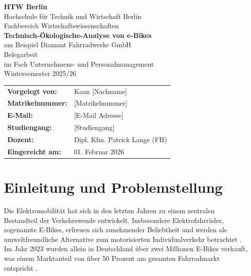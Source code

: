 \documentclass[12pt,a4paper]{article}
\begin{document}
\begin{titlepage}
\centering
\vspace*{2cm}

{\Large\bfseries HTW Berlin}\\[0.5cm]
{\Large Hochschule für Technik und Wirtschaft Berlin}\\[0.5cm]
{\large Fachbereich Wirtschaftswissenschaften}\\[2cm]

{\LARGE\bfseries Technisch-Ökologische-Analyse von e-Bikes}\\[0.5cm]
{\Large am Beispiel Diamant Fahrradwerke GmbH}\\[3cm]

{\large Belegarbeit}\\[0.3cm]
{\large im Fach Unternehmens- und Personalmanagement}\\[0.3cm]
{\large Wintersemester 2025/26}\\[2cm]

\begin{tabular}{ll}
\textbf{Vorgelegt von:} & Kaan [Nachname]\\
\textbf{Matrikelnummer:} & [Matrikelnummer]\\
\textbf{E-Mail:} & [E-Mail Adresse]\\
\textbf{Studiengang:} & [Studiengang]\\[0.5cm]
\textbf{Dozent:} & Dipl. Kfm. Patrick Lange (FH)\\[0.5cm]
\textbf{Eingereicht am:} & 01. Februar 2026\\
\end{tabular}

\vfill
\end{titlepage}

\setcounter{page}{2}

\tableofcontents
\newpage

\setcounter{page}{1}

\section{Einleitung und Problemstellung}

Die Elektromobilität hat sich in den letzten Jahren zu einem zentralen Bestandteil der Verkehrswende entwickelt. Insbesondere Elektrofahrräder, sogenannte E-Bikes, erfreuen sich zunehmender Beliebtheit und werden als umweltfreundliche Alternative zum motorisierten Individualverkehr betrachtet \cite{umweltbundesamt2023}. Im Jahr 2023 wurden allein in Deutschland über zwei Millionen E-Bikes verkauft, was einem Marktanteil von über 50 Prozent am gesamten Fahrradmarkt entspricht \cite{ziv2024}.
\end{document}
